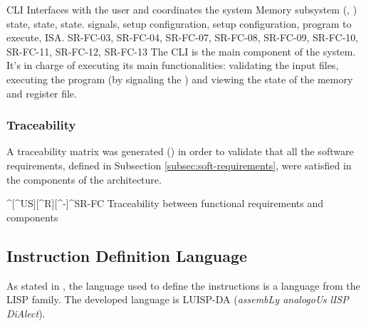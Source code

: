 \begin{component}{CLI}
  {Interfaces with the user and coordinates the system}  %
  {Memory subsystem (, )}  %
  { state,  state,  state.}  %
  { signals,  setup configuration,  setup configuration, program to execute, \gls{ISA}.}  %
  {SR-FC-03, SR-FC-04, SR-FC-07, SR-FC-08, SR-FC-09, SR-FC-10, SR-FC-11, SR-FC-12, SR-FC-13}  %
  The \gls{CLI} is the main component of the system. It's in charge of executing its main functionalities: validating the input files, executing the program (by signaling the ) and viewing the state of the memory and \gls{register} file.
\end{component}

\FloatBarrier




\subsubsection{Traceability}\label{subsec:comp-traceability}
A traceability matrix was generated () in order to validate that all the software requirements, defined in Subsection \ref{subsec:soft-requirements}, were satisfied in the components of the architecture.

  {^[^US][^R][^-]}{^SR-FC}
  {Traceability between functional requirements and components}

\FloatBarrier


\subsection{Instruction Definition Language}\label{subsec:inst-lang-design}
As stated in , the language used to define the instructions is a language from the LISP family. The developed language is LUISP-DA (\textit{assembLy analogoUs lISP DiAlect}).

